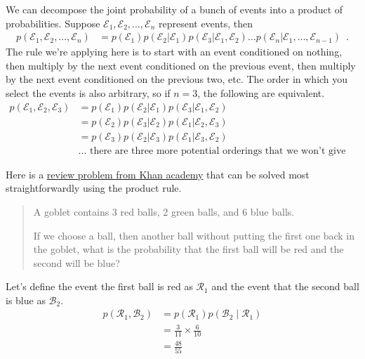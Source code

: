 \documentclass[review_Solutions]{subfiles}
\begin{document}
We can decompose the joint probability of a bunch of events into a product of probabilities.  Suppose $\mathcal{E}_1, \mathcal{E}_2, \ldots, \mathcal{E}_n$ represent events, then
\begin{align}
p(\mathcal{E}_1, \mathcal{E}_2, \ldots, \mathcal{E}_n) &= p(\mathcal{E}_1) p(\mathcal{E}_2 | \mathcal{E}_1) p(\mathcal{E}_3 | \mathcal{E}_1, \mathcal{E}_2) \ldots p(\mathcal{E}_n | \mathcal{E}_1, \ldots, \mathcal{E}_{n-1}) \enspace .
\end{align}
The rule we're applying here is to start with an event conditioned on nothing, then multiply by the next event conditioned on the previous event, then multiply by the next event conditioned on the previous two, etc.  The order in which you select the events is also arbitrary, so if $n=3$, the following are equivalent.
\begin{align}
p(\mathcal{E}_1, \mathcal{E}_2, \mathcal{E}_3) &= p(\mathcal{E}_1) p(\mathcal{E}_2|\mathcal{E}_1)p(\mathcal{E}_3|\mathcal{E}_1, \mathcal{E}_2) \nonumber \\
&= p(\mathcal{E}_2) p(\mathcal{E}_3|\mathcal{E}_2)p(\mathcal{E}_1|\mathcal{E}_2, \mathcal{E}_3) \nonumber \\
&= p(\mathcal{E}_3) p(\mathcal{E}_2|\mathcal{E}_3)p(\mathcal{E}_1|\mathcal{E}_3, \mathcal{E}_2) \nonumber \\
&\mbox{... there are three more potential orderings that we won't give explicitly} \nonumber
\end{align}

\begin{exercise}
Here is a \href{https://www.khanacademy.org/math/ap-statistics/probability-ap/probability-multiplication-rule/e/dependent\_probability}{review problem from Khan academy} that can be solved most straightforwardly using the product rule.

\begin{quote}
A goblet contains 3 red balls, 2 green balls, and 6 blue balls.

If we choose a ball, then another ball without putting the first one back in the goblet, what is the probability that the first ball will be red and the second will be blue?
\end{quote}
\begin{boxedsolution}
Let's define the event the first ball is red as $\mathcal{R}_1$ and the event that the second ball is blue as $\mathcal{B}_2$.
\begin{align}
p(\mathcal{R}_1, \mathcal{B}_2) &= p(\mathcal{R}_1) p(\mathcal{B}_2 \mid \mathcal{R}_1) \nonumber \\
&= \frac{3}{11} \times \frac{6}{10} \nonumber \\
&= \frac{48}{55} \nonumber
\end{align}
\end{boxedsolution}
\end{exercise}
\end{document}
